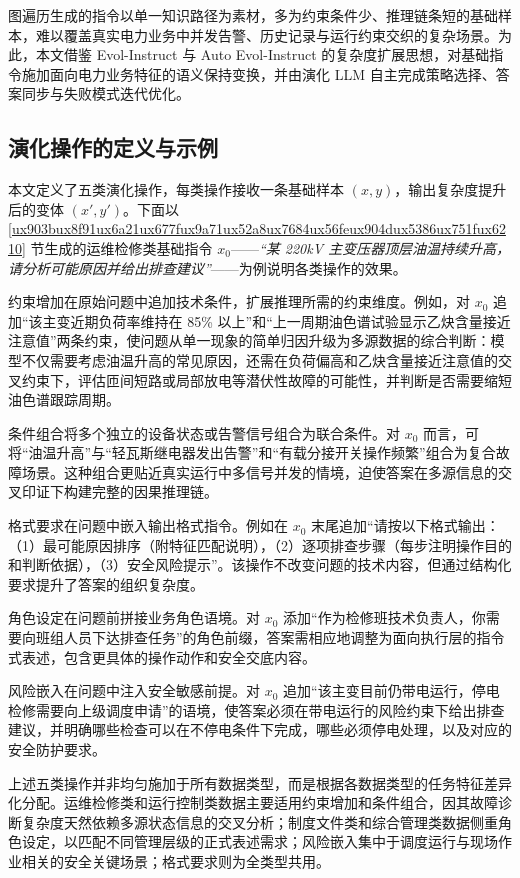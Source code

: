 \documentclass[fontset=fandol,type=master,campus=shenzhen,etitleauto=true]{hithesisbook}
\begin{document}
图遍历生成的指令以单一知识路径为素材，多为约束条件少、推理链条短的基础样本，难以覆盖真实电力业务中并发告警、历史记录与运行约束交织的复杂场景。为此，本文借鉴 Evol-Instruct\cite{ref25} 与 Auto Evol-Instruct\cite{ref53} 的复杂度扩展思想，对基础指令施加面向电力业务特征的语义保持变换，并由演化 LLM 自主完成策略选择、答案同步与失败模式迭代优化。

\subsection{演化操作的定义与示例}\label{ux9762ux5411ux4e03ux7c7bux6570ux636eux7c7bux578bux7684ux5deeux5f02ux5316ux6307ux4ee4ux6f14ux5316}

本文定义了五类演化操作，每类操作接收一条基础样本 $(x, y)$，输出复杂度提升后的变体 $(x', y')$。下面以 \ref{ux903bux8f91ux6a21ux677fux9a71ux52a8ux7684ux56feux904dux5386ux751fux6210} 节生成的运维检修类基础指令 $x_0$——\emph{“某 220kV 主变压器顶层油温持续升高，请分析可能原因并给出排查建议”}——为例说明各类操作的效果。

约束增加在原始问题中追加技术条件，扩展推理所需的约束维度。例如，对 $x_0$ 追加``该主变近期负荷率维持在 85\% 以上''和``上一周期油色谱试验显示乙炔含量接近注意值''两条约束，使问题从单一现象的简单归因升级为多源数据的综合判断：模型不仅需要考虑油温升高的常见原因，还需在负荷偏高和乙炔含量接近注意值的交叉约束下，评估匝间短路或局部放电等潜伏性故障的可能性，并判断是否需要缩短油色谱跟踪周期。

条件组合将多个独立的设备状态或告警信号组合为联合条件。对 $x_0$ 而言，可将``油温升高''与``轻瓦斯继电器发出告警''和``有载分接开关操作频繁''组合为复合故障场景。这种组合更贴近真实运行中多信号并发的情境，迫使答案在多源信息的交叉印证下构建完整的因果推理链。

格式要求在问题中嵌入输出格式指令。例如在 $x_0$ 末尾追加``请按以下格式输出：（1）最可能原因排序（附特征匹配说明），（2）逐项排查步骤（每步注明操作目的和判断依据），（3）安全风险提示''。该操作不改变问题的技术内容，但通过结构化要求提升了答案的组织复杂度。

角色设定在问题前拼接业务角色语境。对 $x_0$ 添加``作为检修班技术负责人，你需要向班组人员下达排查任务''的角色前缀，答案需相应地调整为面向执行层的指令式表述，包含更具体的操作动作和安全交底内容。

风险嵌入在问题中注入安全敏感前提。对 $x_0$ 追加``该主变目前仍带电运行，停电检修需要向上级调度申请''的语境，使答案必须在带电运行的风险约束下给出排查建议，并明确哪些检查可以在不停电条件下完成，哪些必须停电处理，以及对应的安全防护要求。

上述五类操作并非均匀施加于所有数据类型，而是根据各数据类型的任务特征差异化分配。运维检修类和运行控制类数据主要适用约束增加和条件组合，因其故障诊断复杂度天然依赖多源状态信息的交叉分析；制度文件类和综合管理类数据侧重角色设定，以匹配不同管理层级的正式表述需求；风险嵌入集中于调度运行与现场作业相关的安全关键场景；格式要求则为全类型共用。
\end{document}

